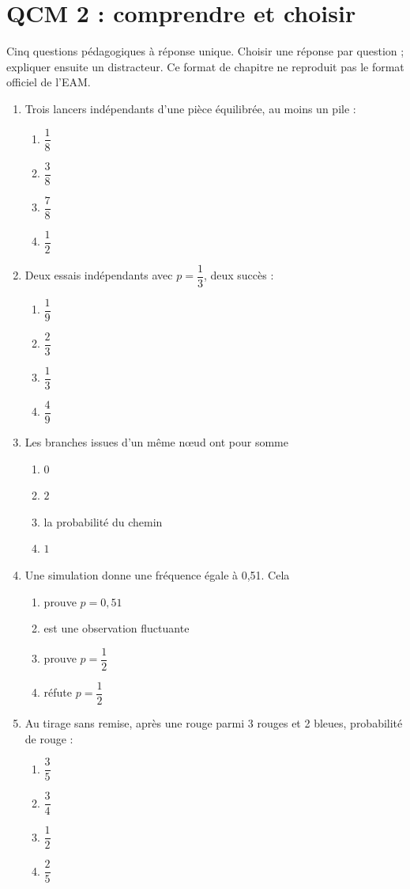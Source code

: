\endgroup
\begingroup\small
{}\section*{QCM 2 : comprendre et choisir}\label{C05-Q2}
Cinq questions pédagogiques à réponse unique. Choisir une réponse par question ; expliquer ensuite un distracteur. Ce format de chapitre ne reproduit pas le format officiel de l’EAM.
\begin{enumerate}
\item Trois lancers indépendants d’une pièce équilibrée, au moins un pile :
\begin{enumerate}[label=\Alph*.,itemsep=2pt]
\item $\dfrac{1}{8}$
\item $\dfrac{3}{8}$
\item $\dfrac{7}{8}$
\item $\dfrac{1}{2}$
\end{enumerate}
\item Deux essais indépendants avec $p=\dfrac{1}{3}$, deux succès :
\begin{enumerate}[label=\Alph*.,itemsep=2pt]
\item $\dfrac{1}{9}$
\item $\dfrac{2}{3}$
\item $\dfrac{1}{3}$
\item $\dfrac{4}{9}$
\end{enumerate}
\item Les branches issues d’un même nœud ont pour somme
\begin{enumerate}[label=\Alph*.,itemsep=2pt]
\item $0$
\item $2$
\item la probabilité du chemin
\item $1$
\end{enumerate}
\item Une simulation donne une fréquence égale à 0,51. Cela
\begin{enumerate}[label=\Alph*.,itemsep=2pt]
\item prouve $p=0{,}51$
\item est une observation fluctuante
\item prouve $p=\dfrac{1}{2}$
\item réfute $p=\dfrac{1}{2}$
\end{enumerate}
\item Au tirage sans remise, après une rouge parmi 3 rouges et 2 bleues, probabilité de rouge :
\begin{enumerate}[label=\Alph*.,itemsep=2pt]
\item $\dfrac{3}{5}$
\item $\dfrac{3}{4}$
\item $\dfrac{1}{2}$
\item $\dfrac{2}{5}$
\end{enumerate}
\end{enumerate}
